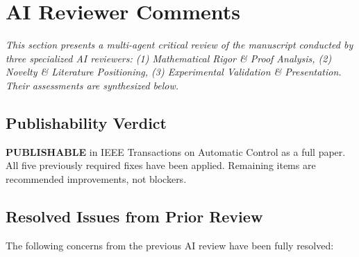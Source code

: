\documentclass[journal,twoside,web]{ieeecolor}
\begin{document}
\onecolumn

\section{AI Reviewer Comments}\label{section_ai_review}

\textit{This section presents a multi-agent critical review of the manuscript conducted by three specialized AI reviewers: (1) Mathematical Rigor \& Proof Analysis, (2) Novelty \& Literature Positioning, (3) Experimental Validation \& Presentation. Their assessments are synthesized below.}

\subsection*{Publishability Verdict}

\textbf{PUBLISHABLE} in IEEE Transactions on Automatic Control as a full paper. All five previously required fixes have been applied. Remaining items are recommended improvements, not blockers.

\subsection*{Resolved Issues from Prior Review}

The following concerns from the previous AI review have been fully resolved:
\end{document}
